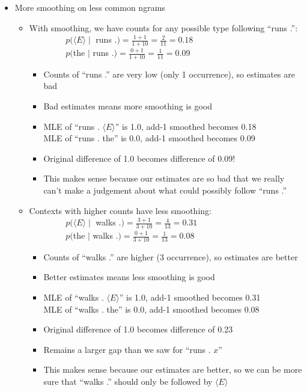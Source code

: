 \documentclass[11pt,letterpaper]{article}
\newcommand{\ngramend}{\ensuremath{\langle E \rangle}}
\begin{document}
\begin{itemize}
  \item More smoothing on less common ngrams
    \begin{itemize}
      \item With smoothing, we have counts for any possible type following ``runs .'': \vspace{1mm} \\
      ~~~~~~~~ $p(\ngramend \mid$ runs .$) = \frac{1+1}{1 + 10} = \frac{2}{11} = 0.18$ \vspace{1mm} \\
      ~~~~~~~~ $p($the $\mid$ runs .$) = \frac{0+1}{1 + 10} = \frac{1}{11} = 0.09$ \vspace{1mm} 
      \begin{itemize}
        \item Counts of ``runs .'' are very low (only 1 occurrence), so estimates are bad
        \item Bad estimates means more smoothing is good
        \item MLE of ``runs . \ngramend'' is 1.0, add-1 smoothed becomes 0.18 \vspace{1mm} \\
              MLE of ``runs . the'' is 0.0, add-1 smoothed becomes 0.09
        \item Original difference of 1.0 becomes difference of 0.09!
        \item This makes sense because our estimates are so bad that we really can't make a judgement about what could possibly follow ``runs .''
      \end{itemize}
      \item Contexts with higher counts have less smoothing: \vspace{1mm} \\
      ~~~~~~~~ $p(\ngramend \mid$ walks .$) = \frac{3+1}{3 + 10} = \frac{4}{13} = 0.31$ \vspace{1mm} \\
      ~~~~~~~~ $p($the $\mid$ walks .$) = \frac{0+1}{3 + 10} = \frac{1}{13} = 0.08$ \vspace{1mm} 
      \begin{itemize}
        \item Counts of ``walks .'' are higher (3 occurrence), so estimates are better
        \item Better estimates means less smoothing is good
        \item MLE of ``walks . \ngramend'' is 1.0, add-1 smoothed becomes 0.31 \vspace{1mm} \\
              MLE of ``walks . the'' is 0.0, add-1 smoothed becomes 0.08
        \item Original difference of 1.0 becomes difference of 0.23
        \item Remains a larger gap than we saw for ``runs . $x$''
        \item This makes sense because our estimates are better, so we can be more sure that ``walks .'' should only be followed by \ngramend
      \end{itemize}
    \end{itemize}


\end{itemize}
\end{document}
